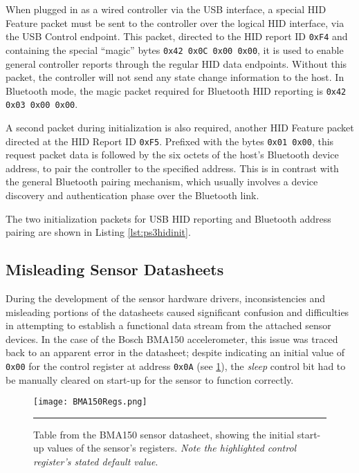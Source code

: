 When plugged in as a wired controller via the USB interface, a special HID Feature packet must be sent to the controller over the logical HID interface, via the USB Control endpoint. This packet, directed to the HID report ID \texttt{0xF4} and containing the special ``magic'' bytes \texttt{0x42 0x0C 0x00 0x00}, it is used to enable general controller reports through the regular HID data endpoints. Without this packet, the controller will not send any state change information to the host. In Bluetooth mode, the magic packet required for Bluetooth HID reporting is \texttt{0x42 0x03 0x00 0x00}.

A second packet during initialization is also required, another HID Feature packet directed at the HID Report ID \texttt{0xF5}. Prefixed with the bytes \texttt{0x01 0x00}, this request packet data is followed by the six octets of the host's Bluetooth device address, to pair the controller to the specified address. This is in contrast with the general Bluetooth pairing mechanism, which usually involves a device discovery and authentication phase over the Bluetooth link.

The two initialization packets for USB HID reporting and Bluetooth address pairing are shown in Listing \ref{lst:ps3hidinit}.



\FloatBarrier
\subsection{Misleading Sensor Datasheets}

During the development of the sensor hardware drivers, inconsistencies and misleading portions of the datasheets caused significant confusion and difficulties in attempting to establish a functional data stream from the attached sensor devices. In the case of the Bosch BMA150 accelerometer, this issue was traced back to an apparent error in the datasheet; despite indicating an initial value of \texttt{0x00} for the control register at address \texttt{0x0A} (see \ref{fig:bma150regs}), the \textit{sleep} control bit had to be manually cleared on start-up for the sensor to function correctly.

\begin{figure}[tbph]
	\centering
		\texttt{[image: BMA150Regs.png]}
	\rule{35em}{0.5pt}
	\caption[BMA150 Register Defaults]{Table from the BMA150 sensor datasheet, showing the initial start-up values of the sensor's registers. \textit{Note the highlighted control register's stated default value}.}
	\label{fig:bma150regs}
\end{figure}

